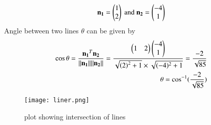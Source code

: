 \documentclass[journal,12pt,twocolumn]{IEEEtran}
\begin{document}
\begin{align}
\mathbf{n_1}=\begin{pmatrix}1\\2\end{pmatrix}\text{ and }\mathbf{n_2}=\begin{pmatrix}-4\\1\end{pmatrix}
\end{align}
Angle between two lines $\theta$ can be given by
\begin{align}
\cos\theta =\frac{\mathbf{n_1}^T\mathbf{n_2}}{\lVert\mathbf{n_1}\rVert\lVert\mathbf{n_2}\rVert}=
\frac{\begin{pmatrix}1&2\end{pmatrix}\begin{pmatrix}-4\\1\end{pmatrix}}{\sqrt{\left(2\right)^2 +1} \times \sqrt{(-4)^2 +1}}=\frac{-2}{\sqrt{85}}\\
\theta = \cos^{-1}(\frac{-2}{\sqrt{85}})
\end{align}
\begin{figure}[!ht]
\centering
\texttt{[image: liner.png]}
\caption{plot showing intersection of lines}
\label{Fig}
\end{figure}
\end{document}
